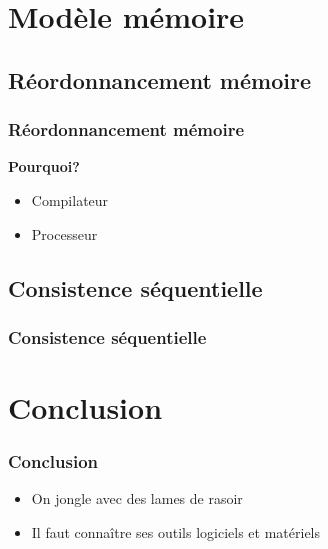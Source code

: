 \documentclass{beamer}
\begin{document}
\section{Modèle mémoire}
\subsection{Réordonnancement mémoire}
\begin{frame}
\frametitle{Réordonnancement mémoire}
\textbf{Pourquoi?}
\begin{itemize}
\item<2-> Compilateur
\item<3-> Processeur
\end{itemize}
\end{frame}

\subsection{Consistence séquentielle}
\begin{frame}
\frametitle{Consistence séquentielle}
\end{frame}

\section{Conclusion}
\begin{frame}
\frametitle{Conclusion}
\begin{itemize}
\item On jongle avec des lames de rasoir
\item<2-> Il faut connaître ses outils logiciels et matériels
\end{itemize}
\end{frame}
\end{document}
